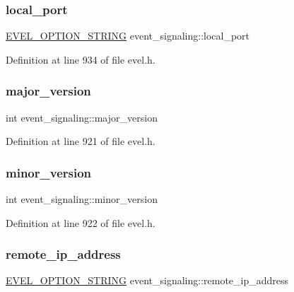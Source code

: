 \subsubsection{\texorpdfstring{local\+\_\+port}{local\_port}}
{\footnotesize\ttfamily \hyperlink{evel_8h_a0de5113a7b72de93c0c7b644f7ea7ec3}{E\+V\+E\+L\+\_\+\+O\+P\+T\+I\+O\+N\+\_\+\+S\+T\+R\+I\+NG} event\+\_\+signaling\+::local\+\_\+port}



Definition at line 934 of file evel.\+h.

\hypertarget{structevent__signaling_a39eb0a8539062056a825729b201e3bc1}{}\label{structevent__signaling_a39eb0a8539062056a825729b201e3bc1} 
\subsubsection{\texorpdfstring{major\+\_\+version}{major\_version}}
{\footnotesize\ttfamily int event\+\_\+signaling\+::major\+\_\+version}



Definition at line 921 of file evel.\+h.

\hypertarget{structevent__signaling_a1053cdae6a8de9f6afc93bacdb594291}{}\label{structevent__signaling_a1053cdae6a8de9f6afc93bacdb594291} 
\subsubsection{\texorpdfstring{minor\+\_\+version}{minor\_version}}
{\footnotesize\ttfamily int event\+\_\+signaling\+::minor\+\_\+version}



Definition at line 922 of file evel.\+h.

\hypertarget{structevent__signaling_a0d9f1983732f3fd977ffac5518621e90}{}\label{structevent__signaling_a0d9f1983732f3fd977ffac5518621e90} 
\subsubsection{\texorpdfstring{remote\+\_\+ip\+\_\+address}{remote\_ip\_address}}
{\footnotesize\ttfamily \hyperlink{evel_8h_a0de5113a7b72de93c0c7b644f7ea7ec3}{E\+V\+E\+L\+\_\+\+O\+P\+T\+I\+O\+N\+\_\+\+S\+T\+R\+I\+NG} event\+\_\+signaling\+::remote\+\_\+ip\+\_\+address}



